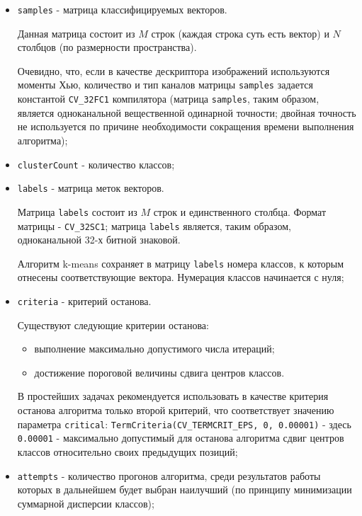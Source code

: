 \begin{itemize}

	\item \verb|samples| - матрица классифицируемых векторов.

	Данная матрица состоит из $M$ строк (каждая строка суть есть вектор) и $N$ столбцов (по размерности пространства).

	Очевидно, что, если в качестве дескриптора изображений используются моменты Хью, количество и тип каналов матрицы \verb|samples| задается константой \verb|CV_32FC1| компилятора (матрица \verb|samples|, таким образом, является одноканальной вещественной одинарной точности; двойная точность не используется по причине необходимости сокращения времени выполнения алгоритма);

	\item \verb|clusterCount| - количество классов;
	\item \verb|labels| - матрица меток векторов.
	
	Матрица \verb|labels| состоит из $M$ строк и единственного столбца. Формат матрицы - \verb|CV_32SC1|; матрица \verb|labels| является, таким образом, одноканальной 32-х битной знаковой.

	Алгоритм k-means сохраняет в матрицу \verb|labels| номера классов, к которым отнесены соответствующие вектора. Нумерация классов начинается с нуля;

	\item \verb|criteria| - критерий останова.

	Существуют следующие критерии останова:

	\begin{itemize}

		\item выполнение максимально допустимого числа итераций;
		\item достижение пороговой величины сдвига центров классов.

	\end{itemize}

	В простейших задачах рекомендуется использовать в качестве критерия останова алгоритма только второй критерий, что соответствует значению параметра \verb|critical|: \verb|TermCriteria(CV_TERMCRIT_EPS, 0, 0.00001)| - здесь \verb|0.00001| - максимально допустимый для останова алгоритма сдвиг центров классов относительно своих предыдущих позиций;

	\item \verb|attempts| - количество прогонов алгоритма, среди результатов работы которых в дальнейшем будет выбран наилучший (по принципу минимизации суммарной дисперсии классов);


\end{itemize}
